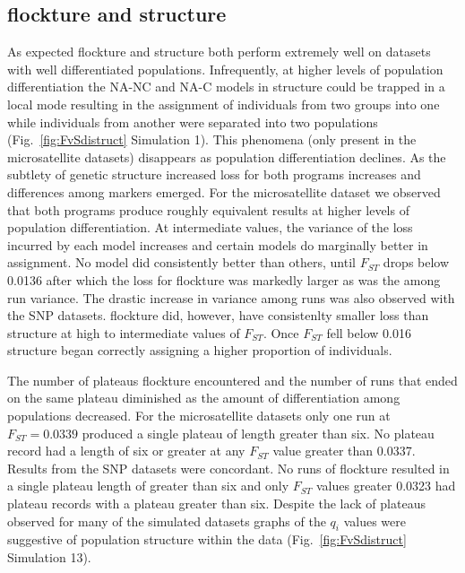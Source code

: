\subsection*{{\sc flockture} and {\sc structure}} 
As expected {\sc flockture} and {\sc structure} both perform extremely well on datasets with
well differentiated populations. Infrequently, at higher levels of population differentiation the 
NA-NC and NA-C models in {\sc structure} could be trapped in a local mode resulting in the 
assignment of individuals from two groups into one while individuals from another 
were separated into two populations (Fig.~\ref{fig:FvSdistruct}  Simulation 1). This phenomena 
(only present in the microsatellite datasets) disappears as population differentiation 
declines. As the subtlety of genetic structure 
increased loss for both programs increases and differences among markers emerged.
For the microsatellite dataset we observed that both programs
produce roughly equivalent results at higher levels of population differentiation. At intermediate 
values, the variance of the loss incurred by each model increases and certain models do marginally
better in assignment. No model did consistently better than others, until $F_{ST}$ drops 
below 0.0136 after which the loss for {\sc flockture} was markedly larger as was the among run
variance. The drastic increase in variance among runs was also observed with the SNP datasets. 
 {\sc flockture} did, however, have consistenlty smaller loss than  {\sc structure} at high to intermediate 
values of $F_{ST}$. Once $F_{ST}$ fell below 0.016 {\sc structure} began correctly assigning a 
higher proportion of individuals. 

The number of plateaus {\sc flockture} encountered and the number of runs that ended on the same plateau 
diminished as the amount of differentiation among populations decreased. For the microsatellite datasets
only one run at $F_{ST} = 0.0339$ produced a single plateau of length greater than six. No plateau record had
a length of six or greater at any $F_{ST}$ value greater than 0.0337. Results from the SNP datasets 
were concordant. No runs of {\sc flockture} resulted in a single plateau length of greater than six and
only $F_{ST}$ values greater 0.0323 had plateau records with a plateau greater than six. Despite the lack of 
plateaus observed for many of the simulated datasets graphs of the $q_i$ values were suggestive 
of population structure within the 
data (Fig.~\ref{fig:FvSdistruct}  Simulation 13). 
 
